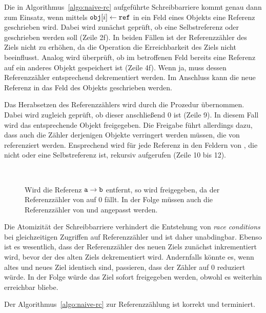 Die in Algorithmus~\ref{algo:naive-rc} aufgeführte Schreibbarriere kommt genau dann zum Einsatz, wenn mittels $\texttt{obj}[i] \gets \texttt{ref}$ in ein Feld eines Objekts eine Referenz geschrieben wird.
Dabei wird zunächst geprüft, ob eine Selbstreferenz oder \Null geschrieben werden soll (Zeile 2f).
In beiden Fällen ist der Referenzzähler des Ziels nicht zu erhöhen, da die Operation die Erreichbarkeit des Ziels nicht beeinflusst.
Analog wird überprüft, ob im betroffenen Feld bereits eine Referenz auf ein anderes Objekt gespeichert ist (Zeile 4f).
Wenn ja, muss dessen Referenzzähler entsprechend dekrementiert werden.
Im Anschluss kann die neue Referenz in das Feld des Objekts geschrieben werden.

Das Herabsetzen des Referenzzählers wird durch die Prozedur  übernommen.
Dabei wird zugleich geprüft, ob dieser anschließend $0$ ist (Zeile 9).
In diesem Fall wird das entsprechende Objekt  freigegeben.
Die Freigabe führt allerdings dazu, dass auch die Zähler derjenigen Objekte verringert werden müssen, die von  referenziert werden.
Ensprechend wird für jede Referenz in den Feldern von , die nicht \Null oder eine Selbstreferenz ist,  rekursiv aufgerufen (Zeile 10 bis 12).

\begin{figure}[h]
	\centering
	~\hspace{1cm}~
	
	\caption[Beispiel für Referenzzählung]{Wird die Referenz $\texttt{a} \rightarrow \texttt{b}$ entfernt, so wird  freigegeben, da der Referenzzähler von  auf $0$ fällt. In der Folge müssen auch die Referenzzähler von  und  angepasst werden.}
	\label{fig:rc-example}
\end{figure}

Die Atomizität der Schreibbarriere verhindert die Entstehung von \textit{race conditions} bei gleichzeitigen Zugriffen auf Referenzzähler und ist daher unabdingbar.
Ebenso ist es wesentlich, dass der Referenzzähler des neuen Ziels zunächst inkrementiert wird, bevor der des alten Ziels dekrementiert wird.
Andernfalls könnte es, wenn altes und neues Ziel identisch sind, passieren, dass der Zähler auf $0$ reduziert würde.
In der Folge würde das Ziel sofort freigegeben werden, obwohl es weiterhin erreichbar bliebe.

\begin{mybox}
\begin{satz}[]
\label{satz:rc-correctness}
	Der Algorithmus~\ref{algo:naive-rc} zur Referenzzählung ist korrekt und terminiert.
\end{satz}
\end{mybox}

